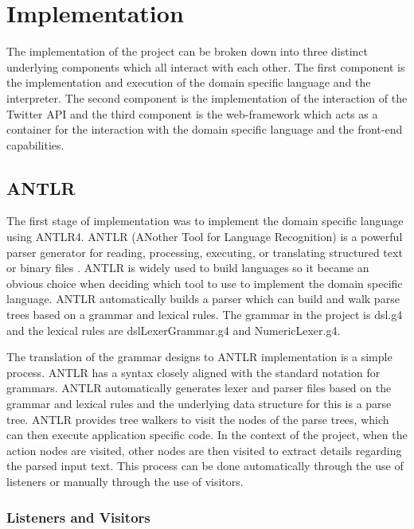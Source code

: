 \chapter{Implementation}

The implementation of the project can be broken down into three distinct underlying components which all interact with each other. The first component is the implementation and execution of the domain specific language and the interpreter. The second component is the implementation of the interaction of the Twitter API and the third component is the web-framework which acts as a container for the interaction with the domain specific language and the front-end capabilities.

\section{ANTLR}

The first stage of implementation was to implement the domain specific language using ANTLR4. ANTLR (ANother Tool for Language Recognition) is a powerful parser generator for reading, processing, executing, or translating structured text or binary files \cite{antlr}. ANTLR is widely used to build languages so it became an obvious choice when deciding which tool to use to implement the domain specific language. ANTLR automatically builds a parser which can build and walk parse trees based on a grammar and lexical rules. The grammar in the project is dsl.g4 and the lexical rules are dslLexerGrammar.g4 and NumericLexer.g4. \newline \par

The translation of the grammar designs to ANTLR implementation is a simple process. ANTLR has a syntax closely aligned with the standard notation for grammars. ANTLR automatically generates lexer and parser files based on the grammar and lexical rules and the underlying data structure for this is a parse tree. ANTLR provides tree walkers to visit the nodes of the parse trees, which can then execute application specific code. In the context of the project, when the action nodes are visited, other nodes are then visited to extract details regarding the parsed input text. This process can be done automatically through the use of listeners or manually through the use of visitors.

\subsection{Listeners and Visitors}

